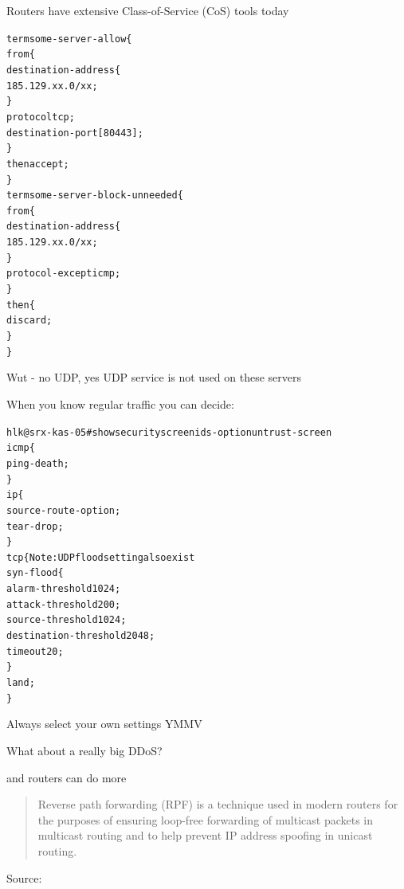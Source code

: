 \documentclass[20pt,landscape,a4paper,footrule]{foils}
\begin{document}
Routers have extensive Class-of-Service (CoS) tools today


\begin{alltt}\footnotesize
term some-server-allow \{
    from \{
        destination-address \{
            185.129.xx.0/xx;
        \}
        protocol tcp;
        destination-port [ 80 443 ];
    \}
    then accept;
\}
term some-server-block-unneeded \{
    from \{
        destination-address \{
            185.129.xx.0/xx;
        \}
        protocol-except icmp;
    \}
    then \{
        discard;
    \}
\}
\end{alltt}

Wut - no UDP, yes UDP service is not used on these servers



When you know regular traffic you can decide:

\begin{alltt}\footnotesize
hlk@srx-kas-05# show security screen ids-option untrust-screen
icmp \{
    ping-death;
\}
ip \{
    source-route-option;
    tear-drop;
\}
tcp \{    Note: UDP flood setting also exist
    syn-flood \{
        alarm-threshold 1024;
        attack-threshold 200;
        source-threshold 1024;
        destination-threshold 2048;
        timeout 20;
    \}
    land;
\}
\end{alltt}

Always select your own settings YMMV


\begin{list1}
\item What about a really big DDoS?
\item and routers can do more
\end{list1}





\begin{quote}
Reverse path forwarding (RPF) is a technique used in modern routers for the purposes of ensuring loop-free forwarding of multicast packets in multicast routing and to help prevent IP address spoofing in unicast routing.
\end{quote}
Source: 

\end{document}
